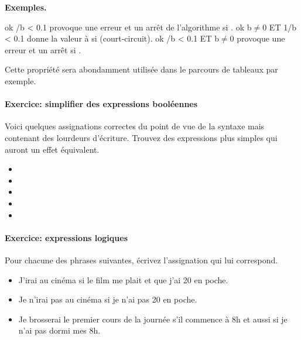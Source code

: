 				\textbf{Exemples.}
				\begin{pseudocode}
					\Let ok /b < 0.1
						\RComment provoque une erreur et un arrêt
						de l’algorithme si . 
					\Let ok \Gets b$\neq$0 ET 1/b < 0.1
						\RComment donne la valeur  à  
						si  (court-circuit). 
					\Let ok /b < 0.1 ET b$\neq$0
						\RComment provoque une erreur et
						un arrêt si . 
				\end{pseudocode}
				
				Cette propriété sera abondamment utilisée dans le parcours
				de tableaux par exemple. 

				
				\begin{Emphase}
				\paragraph{Exercice: simplifier des expressions booléennes}

				Voici quelques assignations correctes du point de vue de la
				syntaxe mais contenant des lourdeurs d’écriture.  Trouvez des
				expressions plus simples qui auront un effet équivalent.
				
				\begin{itemize}
					\item {}
					\item {}
					\item {}
					\item {}
					\item {}
				\end{itemize}		
			\end{Emphase}
		
			\begin{Emphase}
				\paragraph{Exercice: expressions logiques}
				Pour chacune des phrases suivantes,
				écrivez l’assignation qui lui correspond.
				\begin{itemize}
				\item J’irai au cinéma si le film me plait et que 
					j’ai 20\texteuro{} en poche.
				\item Je n’irai pas au cinéma si je n’ai pas 
					20\texteuro{} en poche.
				\item Je brosserai le premier cours de la journée 
					s’il commence à 8h et aussi si je n’ai pas dormi mes 8h.
				\end{itemize}
			\end{Emphase}
			
